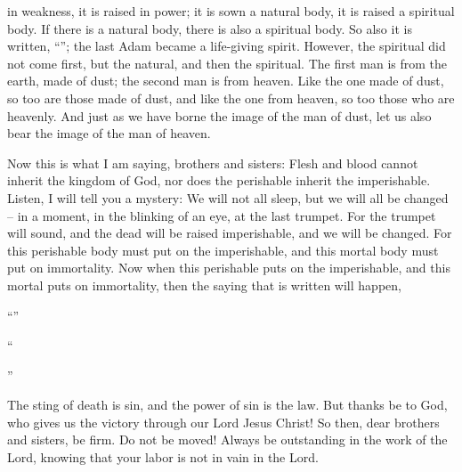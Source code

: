 {in
weakness,
it is raised
in
power;
it is sown
a natural
body,
it is raised
a spiritual
body.
If
there is
a natural
body,
there is
also
a spiritual body.
So
also
it is written, “{}”; the last
Adam
became a life-giving
spirit.
However,
the spiritual
did not
come first,
but
the natural,
and then
the spiritual.
The first
man
is from
the earth,
made of dust;
the second
man
is from
heaven.
Like
the one made of dust,
so too
are those made of dust,
and
like
the one from heaven,
so too
those who are heavenly.
And
just as
we have borne
the image
of the man of dust,
let us
also
bear
the image
of the man of heaven.
\par }{\PP {}Now this
is what I am saying,
brothers and sisters: Flesh
and
blood
cannot
inherit
the kingdom
of God,
nor
does the perishable
inherit
the imperishable.
Listen,
I will tell
you
a mystery: We will
not
all
sleep,
but
we will
all
be changed –
in
a moment,
in
the blinking
of an eye,
at
the last
trumpet.
For
the trumpet will sound,
and
the dead
will be raised
imperishable,
and
we
will be changed.
For
this
perishable body
must put on
the imperishable,
and
this
mortal body
must put on
immortality.
Now
when
this
perishable
puts on
the imperishable, and this mortal puts on immortality,
then
the saying
that is written
will happen,
\par }{\Q “{}”
\par }{\Q {}“{}
\par }{”
\par }{\PI {}The
sting
of death
is sin,
and
the
power
of sin
is the law.
But
thanks
be to God,
who gives
us
the victory
through
our
Lord
Jesus
Christ!
So then,
dear
brothers and sisters,
be
firm.
Do not be moved! Always
be outstanding
in
the work
of the Lord,
knowing
that
your
labor
is
not
in vain
in
the Lord.

}
